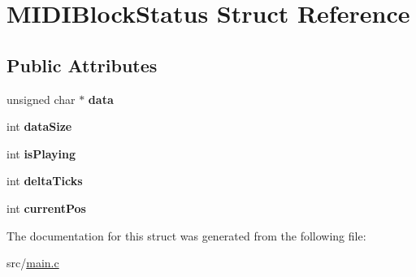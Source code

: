 \hypertarget{structMIDIBlockStatus}{}\section{M\+I\+D\+I\+Block\+Status Struct Reference}
\label{structMIDIBlockStatus}
\subsection*{Public Attributes}
\begin{DoxyCompactItemize}
\item 
\mbox{\label{structMIDIBlockStatus_a4ff218757771301c23514d2ab31af146}} 
unsigned char $\ast$ {\bfseries data}
\item 
\mbox{\label{structMIDIBlockStatus_af35dc6eeaa93f01c73e308a6d34316d3}} 
int {\bfseries data\+Size}
\item 
\mbox{\label{structMIDIBlockStatus_a1db881c91aaf122add746eacb30acebf}} 
int {\bfseries is\+Playing}
\item 
\mbox{\label{structMIDIBlockStatus_a671d56d5ecea2ed5e94b871e5995c6f1}} 
int {\bfseries delta\+Ticks}
\item 
\mbox{\label{structMIDIBlockStatus_a27dae156bd6248d095ad04d41ef6d4f8}} 
int {\bfseries current\+Pos}
\end{DoxyCompactItemize}


The documentation for this struct was generated from the following file\+:\begin{DoxyCompactItemize}
\item 
src/\hyperlink{main_8c}{main.\+c}\end{DoxyCompactItemize}
